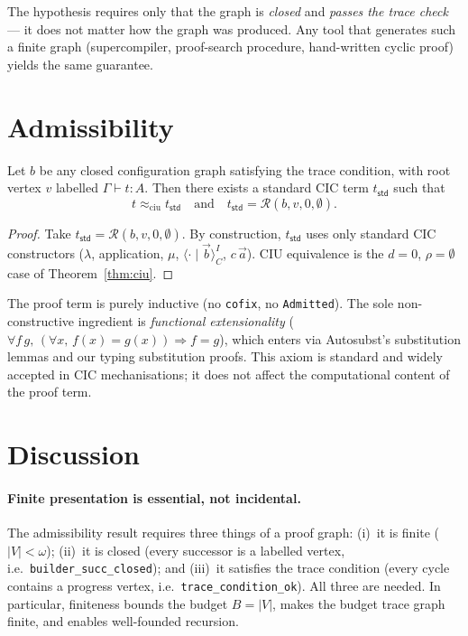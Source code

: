 \documentclass[runningheads]{llncs}
\newcommand{\ciu}{\approx_{\mathrm{ciu}}}
\newcommand{\tconf}[3]{#1 \vdash #2 : #3}
\begin{document}
\noindent The hypothesis requires only that the graph is \emph{closed} and
\emph{passes the trace check} --- it does not matter how the graph was
produced.  Any tool that generates such a finite graph (supercompiler,
proof-search procedure, hand-written cyclic proof) yields the same
guarantee.

\section{Admissibility}

\begin{theorem}
\label{thm:admissible}
Let $b$ be any closed configuration graph satisfying the trace condition,
with root vertex $v$ labelled $\tconf{\Gamma}{t}{A}$.
Then there exists a standard CIC term $t_{\mathsf{std}}$ such that
\[
  t \ciu t_{\mathsf{std}}
  \quad\text{and}\quad
  t_{\mathsf{std}} = \mathcal{R}(b,v,0,\emptyset).
\]
\end{theorem}

\begin{proof}
Take $t_{\mathsf{std}} = \mathcal{R}(b,v,0,\emptyset)$.
By construction, $t_{\mathsf{std}}$ uses only standard CIC constructors
($\lambda$, application, $\mu$, $\langle \cdot \mid \vec{b} \rangle^I_C$, $c\,\vec{a}$).
CIU equivalence is the $d{=}0$, $\rho{=}\emptyset$ case of
Theorem~\ref{thm:ciu}.
\end{proof}

The proof term is purely inductive (no \texttt{cofix}, no \texttt{Admitted}).
The sole non-constructive ingredient is \emph{functional extensionality}
($\forall f\,g,\,(\forall x,\,f(x)=g(x))\Rightarrow f=g$), which enters
via Autosubst's substitution lemmas and our typing substitution proofs.
This axiom is standard and widely accepted in CIC mechanisations; it does
not affect the computational content of the proof term.

\section{Discussion}

\paragraph{Finite presentation is essential, not incidental.}
The admissibility result requires three things of a proof graph:
(i)~it is finite ($|V| < \omega$); (ii)~it is closed (every successor is a
labelled vertex, i.e.\ \texttt{builder\_succ\_closed}); and
(iii)~it satisfies the trace condition (every cycle contains a progress
vertex, i.e.\ \texttt{trace\_condition\_ok}).  All three are needed.
In particular, finiteness bounds the budget $B = |V|$, makes the budget
trace graph finite, and enables well-founded recursion.
\end{document}

